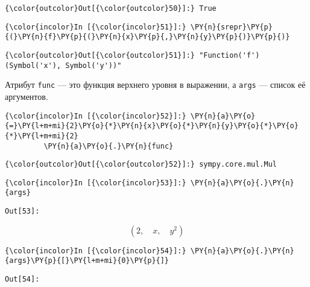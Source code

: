            \begin{Verbatim}[commandchars=\\\{\}]
{\color{outcolor}Out[{\color{outcolor}50}]:} True
\end{Verbatim}
        
    \begin{Verbatim}[commandchars=\\\{\}]
{\color{incolor}In [{\color{incolor}51}]:} \PY{n}{srepr}\PY{p}{(}\PY{n}{f}\PY{p}{(}\PY{n}{x}\PY{p}{,}\PY{n}{y}\PY{p}{)}\PY{p}{)}
\end{Verbatim}

            \begin{Verbatim}[commandchars=\\\{\}]
{\color{outcolor}Out[{\color{outcolor}51}]:} "Function('f')(Symbol('x'), Symbol('y'))"
\end{Verbatim}
        
    Атрибут \texttt{func} --- это функция верхнего уровня в выражении, а
\texttt{args} --- список её аргументов.

    \begin{Verbatim}[commandchars=\\\{\}]
{\color{incolor}In [{\color{incolor}52}]:} \PY{n}{a}\PY{o}{=}\PY{l+m+mi}{2}\PY{o}{*}\PY{n}{x}\PY{o}{*}\PY{n}{y}\PY{o}{*}\PY{o}{*}\PY{l+m+mi}{2}
         \PY{n}{a}\PY{o}{.}\PY{n}{func}
\end{Verbatim}

            \begin{Verbatim}[commandchars=\\\{\}]
{\color{outcolor}Out[{\color{outcolor}52}]:} sympy.core.mul.Mul
\end{Verbatim}
        
    \begin{Verbatim}[commandchars=\\\{\}]
{\color{incolor}In [{\color{incolor}53}]:} \PY{n}{a}\PY{o}{.}\PY{n}{args}
\end{Verbatim}
\texttt{\color{outcolor}Out[{\color{outcolor}53}]:}
    
    \[\left ( 2, \quad x, \quad y^{2}\right )\]

    

    \begin{Verbatim}[commandchars=\\\{\}]
{\color{incolor}In [{\color{incolor}54}]:} \PY{n}{a}\PY{o}{.}\PY{n}{args}\PY{p}{[}\PY{l+m+mi}{0}\PY{p}{]}
\end{Verbatim}
\texttt{\color{outcolor}Out[{\color{outcolor}54}]:}
    
